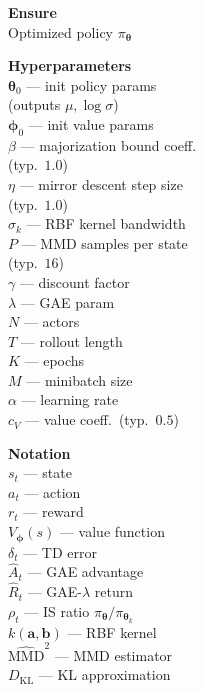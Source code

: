 \documentclass[11pt]{article}
\begin{document}
\begin{algorithm}[p]\small
\caption{MM-RKHS --- Gupta \& Mahajan}\label{alg:mmrkhs}
\vspace{2pt}
\noindent
\begin{minipage}[t]{0.28\linewidth}
\renewcommand{\arraystretch}{1.12}
\textbf{Ensure} \\[2pt]
Optimized policy $\pi_{\boldsymbol{\theta}}$

\vspace{6pt}
\textbf{Hyperparameters} \\[2pt]
$\boldsymbol{\theta}_0$ --- init policy params \\
\hspace*{1em}(outputs $\mu, \log\sigma$) \\
$\boldsymbol{\phi}_0$ --- init value params \\
$\beta$ --- majorization bound coeff. \\
\hspace*{1em}(typ.\ $1.0$) \\
$\eta$ --- mirror descent step size \\
\hspace*{1em}(typ.\ $1.0$) \\
$\sigma_k$ --- RBF kernel bandwidth \\
$P$ --- MMD samples per state \\
\hspace*{1em}(typ.\ $16$) \\
$\gamma$ --- discount factor \\
$\lambda$ --- GAE param \\
$N$ --- actors \\
$T$ --- rollout length \\
$K$ --- epochs \\
$M$ --- minibatch size \\
$\alpha$ --- learning rate \\
$c_V$ --- value coeff.\ (typ.\ $0.5$)

\vspace{6pt}
\textbf{Notation} \\[2pt]
$s_t$ --- state \\
$a_t$ --- action \\
$r_t$ --- reward \\
$V_{\boldsymbol{\phi}}(s)$ --- value function \\
$\delta_t$ --- TD error \\
$\hat{A}_t$ --- GAE advantage \\
$\hat{R}_t$ --- GAE-$\lambda$ return \\
$\rho_t$ --- IS ratio $\pi_{\boldsymbol{\theta}} / \pi_{\boldsymbol{\theta}_k}$ \\
$k(\mathbf{a}, \mathbf{b})$ --- RBF kernel \\
$\widehat{\text{MMD}}^2$ --- MMD estimator \\
$D_{\text{KL}}$ --- KL approximation


\end{minipage}
\end{algorithm}
\end{document}
